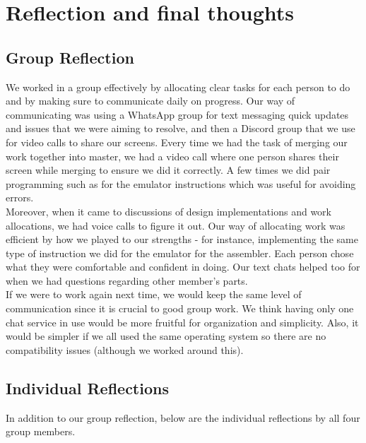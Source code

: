 \documentclass[11pt]{article}
\begin{document}
\section{Reflection and final thoughts}
\subsection{Group Reflection}
We worked in a group effectively by allocating clear tasks for each person to do and by making sure to communicate daily on progress. Our way of communicating was using a WhatsApp group for text messaging quick updates and issues that we were aiming to resolve, and then a Discord group that we use for video calls to share our screens. Every time we had the task of merging our work together into master, we had a video call where one person shares their screen while merging to ensure we did it correctly. A few times we did pair programming such as for the emulator instructions which was useful for avoiding errors.\\ 
Moreover, when it came to discussions of design implementations and work allocations, we had voice calls to figure it out. Our way of allocating work was efficient by how we played to our strengths - for instance, implementing the same type of instruction we did for the emulator for the assembler. Each person chose what they were comfortable and confident in doing. Our text chats helped too for when we had questions regarding other member's parts.\\
If we were to work again next time, we would keep the same level of communication since it is crucial to good group work. We think having only one chat service in use would be more fruitful for organization and simplicity. Also, it would be simpler if we all used the same operating system so there are no compatibility issues (although we worked around this).

\subsection{Individual Reflections}
In addition to our group reflection, below are the individual reflections by all four group members.
\end{document}
